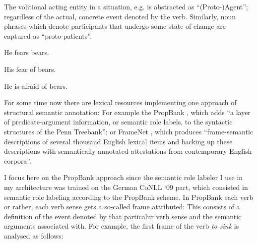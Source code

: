 The volitional acting entity in a situation, e.g. is
abstracted as ``(Proto-)Agent''; regardless of the actual, concrete event denoted by
the verb. Similarly, noun phrases which denote participants that undergo some state
of change are captured as ``proto-patients''.

\begin{examples}
  \item He fears bears.
  \item His fear of bears.
  \item He is afraid of bears.
\end{examples}

For some time now there are lexical resources implementing one approach of structural
semantic annotation: For example the PropBank \citep{palmer2005proposition}, which adds
``a layer of predicate-argument information, or semantic role labels, to the syntactic
structures of the Penn Treebank''; or FrameNet \citep{baker1998berkeley}, which produces
``frame-semantic descriptions of several thousand English lexical items and backing up
these descriptions with semantically annotated attestations from contemporary English
corpora''.


I focus here on the PropBank approach since the semantic role labeler I use in my
architecture was trained on the German CoNLL `09 \citep{hajivc2009conll} part, which
consisted in semantic role labeling according to the PropBank scheme. In PropBank
each verb or rather, each verb sense gets a so-called frame attributed: This consists
of a definition of the event denoted by that particalur verb sense and the semantic
arguments associated with. For example, the first frame of the verb \emph{to
sink}
is analysed as follows:

\noindent{}

